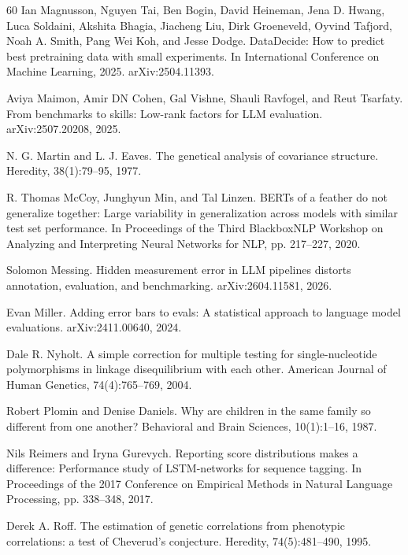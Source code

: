 \begin{thebibliography}{60}
Ian Magnusson, Nguyen Tai, Ben Bogin, David Heineman, Jena D. Hwang, Luca Soldaini, Akshita Bhagia, Jiacheng Liu, Dirk Groeneveld, Oyvind Tafjord, Noah A. Smith, Pang Wei Koh, and Jesse Dodge. DataDecide: How to predict best pretraining data with small experiments. In International Conference on Machine Learning, 2025. arXiv:2504.11393.

Aviya Maimon, Amir DN Cohen, Gal Vishne, Shauli Ravfogel, and Reut Tsarfaty. From benchmarks to skills: Low-rank factors for LLM evaluation. arXiv:2507.20208, 2025.

N. G. Martin and L. J. Eaves. The genetical analysis of covariance structure. Heredity, 38(1):79--95, 1977.

R. Thomas McCoy, Junghyun Min, and Tal Linzen. BERTs of a feather do not generalize together: Large variability in generalization across models with similar test set performance. In Proceedings of the Third BlackboxNLP Workshop on Analyzing and Interpreting Neural Networks for NLP, pp. 217--227, 2020.

Solomon Messing. Hidden measurement error in LLM pipelines distorts annotation, evaluation, and benchmarking. arXiv:2604.11581, 2026.

Evan Miller. Adding error bars to evals: A statistical approach to language model evaluations. arXiv:2411.00640, 2024.

Dale R. Nyholt. A simple correction for multiple testing for single-nucleotide polymorphisms in linkage disequilibrium with each other. American Journal of Human Genetics, 74(4):765--769, 2004.

Robert Plomin and Denise Daniels. Why are children in the same family so different from one another? Behavioral and Brain Sciences, 10(1):1--16, 1987.

Nils Reimers and Iryna Gurevych. Reporting score distributions makes a difference: Performance study of LSTM-networks for sequence tagging. In Proceedings of the 2017 Conference on Empirical Methods in Natural Language Processing, pp. 338--348, 2017.

Derek A. Roff. The estimation of genetic correlations from phenotypic correlations: a test of Cheverud's conjecture. Heredity, 74(5):481--490, 1995.


\end{thebibliography}

